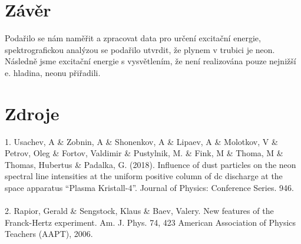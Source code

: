 \documentclass[czech,11pt,a4paper]{article}
\begin{document}
\begin{multicols}{2}
		
		
		
		
		
		\section{Závěr}
		Podařilo se nám naměřit a zpracovat data pro určení excitační energie, spektrografickou analýzou se podařilo utvrdit, že plynem v trubici je neon. Následně jsme excitační energie s vysvětlením, že není realizována pouze nejnižší e. hladina, neonu přiřadili.
	
		

		
		\section{Zdroje}
		
		1. Usachev, A \& Zobnin, A \& Shonenkov, A \& Lipaev, A \& Molotkov, V \& Petrov, Oleg \& Fortov, Valdimir \& Pustylnik, M. \& Fink, M \& Thoma, M \& Thomas, Hubertus \& Padalka, G. (2018). Influence of dust particles on the neon spectral line intensities at the uniform positive column of dc discharge at the space apparatus “Plasma Kristall-4”. Journal of Physics: Conference Series. 946. \\ \\
		2.  Rapior, Gerald \& Sengstock, Klaus \& Baev, Valery. New features of the Franck-Hertz experiment. Am. J. Phys. 74, 423 American Association of Physics Teachers (AAPT), 2006.
		
	
		
		
	\end{multicols}
\end{document}
